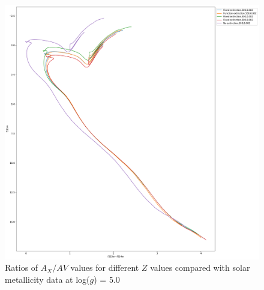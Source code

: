 \documentclass[a4paper, 11pt, oneside]{LJMU_Astro_Thesis}  %
\begin{document}
\begin{figure}[h]
\begin{center}
\includegraphics[scale=0.3]{../basti_isochrones_10_13Gyr/Extinction_T5k_FeH0fix_func_f555w_f555wmf814w_500_400_600_Myr_FeH_0p002_ref_noext_Av_1p0.pdf}
\caption{Ratios of $A_{X}/A{V}$ values for different $Z$ values compared with solar metallicity data at log($g$) = 5.0}
\label{wfc3_isoc1_T5k}
\end{center}
\end{figure}
\end{document}
